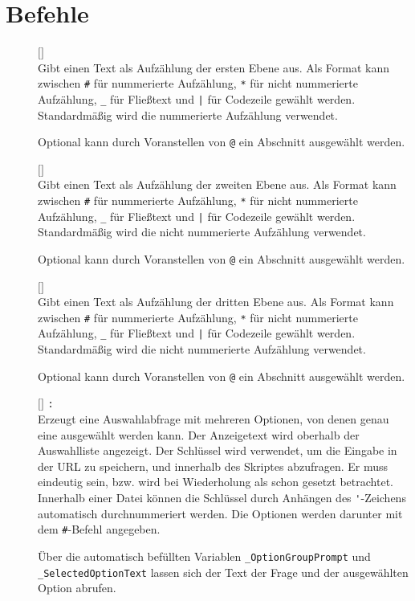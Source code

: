 \section{Befehle}\label{Befehle}
\begin{description}

\item[\cidxfrag{>\mbox{}>}]$[$$]$ \\
Gibt einen Text als Aufzählung der ersten Ebene aus. Als Format kann zwischen \verb|#| für nummerierte Aufzählung, \verb|*| für nicht nummerierte Aufzählung, \verb|_| für Fließtext und \verb=|= für Codezeile gewählt werden. Standardmäßig wird die nummerierte Aufzählung verwendet.\par
Optional kann durch Voranstellen von \verb|@| ein Abschnitt ausgewählt werden.

\item[\cidxfrag{>}]$[$$]$ \\
Gibt einen Text als Aufzählung der zweiten Ebene aus. Als Format kann zwischen \verb|#| für nummerierte Aufzählung, \verb|*| für nicht nummerierte Aufzählung, \verb|_| für Fließtext und \verb=|= für Codezeile gewählt werden. Standardmäßig wird die nicht nummerierte Aufzählung verwendet.\par
Optional kann durch Voranstellen von \verb|@| ein Abschnitt ausgewählt werden.

\item[]$[$$]$ \\
Gibt einen Text als Aufzählung der dritten Ebene aus. Als Format kann zwischen \verb|#| für nummerierte Aufzählung, \verb|*| für nicht nummerierte Aufzählung, \verb|_| für Fließtext und \verb=|= für Codezeile gewählt werden. Standardmäßig wird die nicht nummerierte Aufzählung verwendet.\par
Optional kann durch Voranstellen von \verb|@| ein Abschnitt ausgewählt werden.

\item[] $[$$]$ \verb|:| \\
Erzeugt eine Auswahlabfrage mit mehreren Optionen, von denen genau eine ausgewählt werden kann. Der Anzeigetext wird oberhalb der Auswahlliste angezeigt.
Der Schlüssel wird verwendet, um die Eingabe in der URL zu speichern, und innerhalb des Skriptes abzufragen. Er muss eindeutig sein, bzw. wird bei Wiederholung als schon gesetzt betrachtet. Innerhalb einer Datei können die Schlüssel durch Anhängen des \verb|'|-Zeichens automatisch durchnummeriert werden. Die Optionen werden darunter mit dem \verb|#|-Befehl angegeben.\par
Über die automatisch befüllten Variablen \verb|_OptionGroupPrompt| und \verb|_SelectedOptionText| lassen sich der Text der Frage und der ausgewählten Option abrufen.


\end{description}
